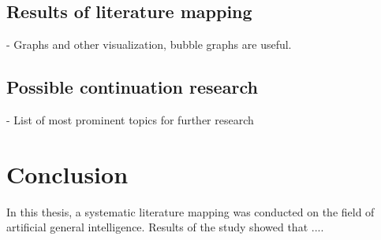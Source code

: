 \documentclass[utf8,english]{gradu3}
\begin{document}
\section{Results of literature mapping}
- Graphs and other visualization, bubble graphs are useful.

\section{Possible continuation research}

- List of most prominent topics for further research

\chapter{Conclusion}
In this thesis, a systematic literature mapping was conducted on the field of artificial general intelligence. Results of the study showed that .... 

\printbibliography
\end{document}

